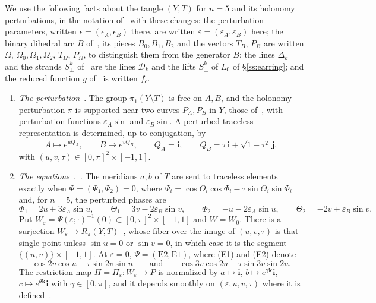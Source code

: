 We use the following facts about the tangle $(Y,T)$ for $n=5$ and its holonomy perturbations, in the notation
of~\cite[\S\S3--6]{WuebbenV} with these changes: the perturbation parameters, written $\epsilon=(\epsilon_A,\epsilon_B)$
there, are written $\varepsilon=(\varepsilon_A,\varepsilon_B)$ here; the binary dihedral arc $B$ of~\cite{WuebbenV}, its
pieces $B_0,B_1,B_2$ and the vectors $T_B$, $P_B$ are written $\Omega$, $\Omega_0,\Omega_1,\Omega_2$, $T_\Omega$, $P_\Omega$, to
distinguish them from the generator $B$; the lines $\Delta_k$ and the strands $S^k_\pm$ of~\cite{WuebbenV} are the lines
$\mathcal D_k$ and the lifts $S^k_\pm$ of $L_0$ of \S\ref{ss:earring}; and the reduced function $g$
of~\cite[\S5.2]{WuebbenV} is written $f_c$.
\begin{enumerate}
\item[(P1)] \emph{The perturbation}~\cite[\S3.1]{WuebbenV}. The group $\pi_1(Y\setminus T)$ is free on $A,B$, and the
holonomy perturbation $\pi$ is supported near two curves $P_A,P_B$ in $Y$, those of~\cite[\S10]{HHK2}, with
perturbation functions $\varepsilon_A\sin$ and $\varepsilon_B\sin$. A perturbed traceless representation is determined, up
to conjugation, by
\[
A\mapsto e^{uQ_A},\qquad B\mapsto e^{vQ_B},\qquad Q_A=\mathbf i,\qquad Q_B=\tau\,\mathbf i+\sqrt{1-\tau^2}\,\mathbf j,
\]
with $(u,v,\tau)\in[0,\pi]^2\times[-1,1]$.
\item[(P2)] \emph{The equations}~\cite[\S3.1 and Lemma~3.1]{WuebbenV},~\cite[(33)--(34)]{HHK2}. The meridians $a,b$ of
$T$ are sent to traceless elements exactly when $\Psi=(\Psi_1,\Psi_2)=0$, where
$\Psi_i=\cos\Theta_i\cos\Phi_i-\tau\sin\Theta_i\sin\Phi_i$ and, for $n=5$, the perturbed phases are
\[
\Phi_1=2u+3\varepsilon_A\sin u,\qquad \Theta_1=3v-2\varepsilon_B\sin v,\qquad \Phi_2=-u-2\varepsilon_A\sin u,\qquad
\Theta_2=-2v+\varepsilon_B\sin v .
\]
Put $W_\varepsilon=\Psi(\varepsilon;\cdot)^{-1}(0)\subset[0,\pi]^2\times[-1,1]$ and $W=W_0$. There is a surjection
$W_\varepsilon\to R_\pi(Y,T)$~\cite[Thm.~10.2]{HHK2}, whose fiber over the image of $(u,v,\tau)$ is that single point unless
$\sin u=0$ or $\sin v=0$, in which case it is the segment $\{(u,v)\}\times[-1,1]$. At $\varepsilon=0$,
$\Psi=(\mathrm{E2},\mathrm{E1})$, where (E1) and (E2) denote
\[
\cos2v\cos u-\tau\sin2v\sin u\qquad\text{and}\qquad\cos3v\cos2u-\tau\sin3v\sin2u .
\]
The restriction map $\Pi=\Pi_\varepsilon\colon W_\varepsilon\to P$ is normalized by $a\mapsto\mathbf i$,
$b\mapsto e^{\gamma\mathbf k}\mathbf i$, $c\mapsto e^{\theta\mathbf k}\mathbf i$ with $\gamma\in[0,\pi]$, and it depends smoothly on
$(\varepsilon,u,v,\tau)$ where it is defined~\cite[\S\S3.1, 5]{WuebbenV}.
\end{enumerate}

